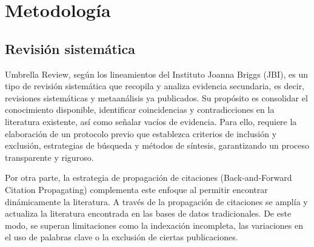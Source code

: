 \chapter{Metodología}
\section{Revisión sistemática}
Umbrella Review, según los lineamientos del Instituto Joanna Briggs (JBI), es un tipo de revisión sistemática que recopila y analiza evidencia secundaria, 
es decir, revisiones sistemáticas y metaanálisis ya publicados.
Su propósito es consolidar el conocimiento disponible, identificar coincidencias y contradicciones en la literatura existente, así como señalar vacíos de evidencia.
Para ello, requiere la elaboración de un protocolo previo que establezca criterios de inclusión y exclusión, estrategias de búsqueda y métodos de síntesis, garantizando 
un proceso transparente y riguroso.

Por otra parte, la estrategia de propagación de citaciones (Back-and-Forward Citation Propagating) complementa este enfoque al permitir encontrar dinámicamente la literatura. 
A través de la propagación de citaciones se amplía y actualiza la literatura encontrada en las bases de datos tradicionales. De este modo, se superan limitaciones como la 
indexación incompleta, las variaciones en el uso de palabras clave o la exclusión de ciertas publicaciones.


